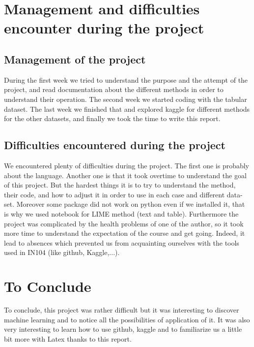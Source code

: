 \documentclass[sigplan,screen]{acmart}
\begin{document}
\section{Management and difficulties encounter during the project}
\subsection{Management of the project}
\Large
During the first week we tried to understand the purpose and the attempt of the project, and read documentation about the different methods in order to understand their operation. The second week we started coding with the tabular dataset. The last week we finished that and explored  kaggle for different methods for the other datasets, and finally we took the time to write this report.

\subsection{Difficulties encountered during the project}
\Large
We encountered plenty of difficulties during the project. The first one is probably about the language. Another one is that it took overtime to understand the goal of this project. But the hardest things it is to try to understand the method, their code, and how to adjust it in order to use in each case and different data-set. Moreover some package did not work on python even if we installed it, that is why we used notebook for LIME method (text and table).
Furthermore the project was complicated by the health problems of one of the author, so it took more time to understand the expectation of the course and get going. Indeed, it lead to absences which prevented us from acquainting ourselves with the tools used in IN104 (like github, Kaggle,...).

\section{To Conclude}
\Large
To conclude, this project was rather difficult but it was interesting to discover machine learning and to notice all the possibilities of application of it. It was also very interesting to learn how to use github, kaggle and to familiarize us a little bit more with Latex thanks to this report.
\end{document}
